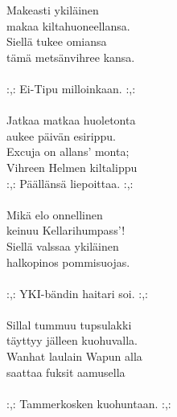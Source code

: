 
Makeasti ykiläinen \\ makaa kiltahuoneellansa. \\ Siellä tukee omiansa \\ tämä metsänvihree kansa. \\ \hspace{10mm} \\ :,: Ei-Tipu milloinkaan. :,: \\ \hspace{10mm} \\ Jatkaa matkaa huoletonta \\ aukee päivän esirippu. \\ Excuja on allans' monta; \\ Vihreen Helmen kiltalippu \\ :,: Päällänsä liepoittaa. :,: \\ \hspace{10mm} \\ Mikä elo onnellinen \\ keinuu Kellarihumpass'! \\ Siellä valssaa ykiläinen \\ halkopinos pommisuojas. \\ \hspace{10mm} \\ :,: YKI-bändin haitari soi. :,: \\ \hspace{10mm} \\ Sillal tummuu tupsulakki \\ täyttyy jälleen kuohuvalla. \\ Wanhat laulain Wapun alla \\ saattaa fuksit aamusella \\ \hspace{10mm} \\ :,: Tammerkosken kuohuntaan. :,: